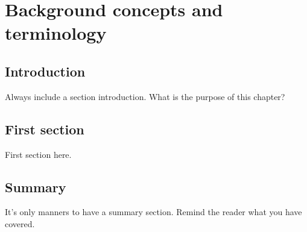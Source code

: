\chapter{Background concepts and terminology}\label{chapter:background-concepts-terminology}

\section{Introduction}\label{sec:terminology-intro}
Always include a section introduction. What is the purpose of this chapter?

\section{First section}\label{sec:terminology-first-section}
First section here.

\section{Summary}\label{sec:terminology-summary}
It's only manners to have a summary section. Remind the reader what you have covered.